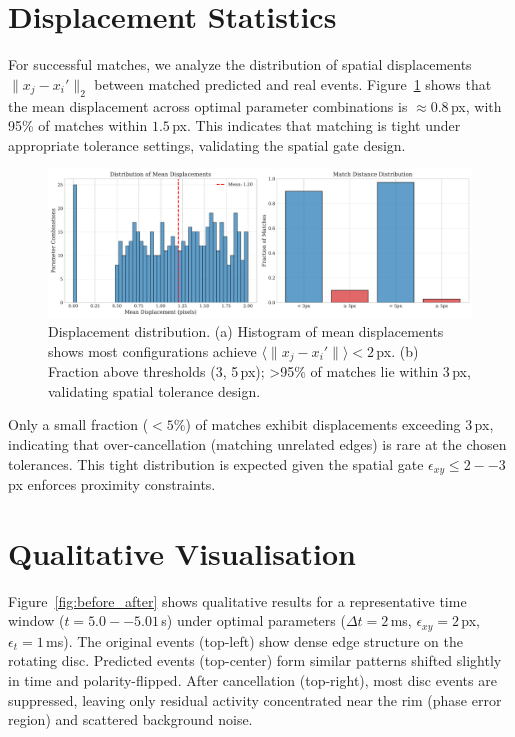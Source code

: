 \section{Displacement Statistics}

For successful matches, we analyze the distribution of spatial displacements $\|x_j - x_i'\|_2$ between matched predicted and real events. Figure~\ref{fig:displacement} shows that the mean displacement across optimal parameter combinations is $\approx 0.8$\,px, with 95\% of matches within $1.5$\,px. This indicates that matching is tight under appropriate tolerance settings, validating the spatial gate design.

\begin{figure}[t]
  \centering
  \includegraphics[width=0.85\linewidth]{../code/thesis_figures/figure_displacement_distribution.pdf}
\caption{Displacement distribution. (a) Histogram of mean displacements shows most configurations achieve $\langle \|x_j - x_i'\| \rangle < 2$\,px. (b) Fraction above thresholds (3, 5\,px); >95\% of matches lie within 3\,px, validating spatial tolerance design.}
  \label{fig:displacement}
\end{figure}

Only a small fraction ($< 5\%$) of matches exhibit displacements exceeding 3\,px, indicating that over-cancellation (matching unrelated edges) is rare at the chosen tolerances. This tight distribution is expected given the spatial gate $\epsilon_{xy} \leq 2--3$\,px enforces proximity constraints.

\section{Qualitative Visualisation}

Figure~\ref{fig:before_after} shows qualitative results for a representative time window ($t=5.0--5.01$\,s) under optimal parameters ($\Delta t=2$\,ms, $\epsilon_{xy}=2$\,px, $\epsilon_t=1$\,ms). The original events (top-left) show dense edge structure on the rotating disc. Predicted events (top-center) form similar patterns shifted slightly in time and polarity-flipped. After cancellation (top-right), most disc events are suppressed, leaving only residual activity concentrated near the rim (phase error region) and scattered background noise.

